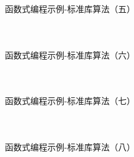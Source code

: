 \documentclass[UTF8,aspectratio=169]{beamer}
\begin{document}
\begin{frame}[fragile]{函数式编程示例-标准库算法（五）}
    \begin{columns}
        \begin{column}{0.48\textwidth}
            \inputminted[firstline=124,lastline=143]{cpp}{code/functional_programming_6.cpp}
        \end{column}
        \begin{column}{0.48\textwidth}
            \inputminted[firstline=145,lastline=159]{cpp}{code/functional_programming_6.cpp}
        \end{column}
    \end{columns}
\end{frame}

\begin{frame}[fragile]{函数式编程示例-标准库算法（六）}
    \begin{columns}
        \begin{column}{0.48\textwidth}
            \inputminted[firstline=161,lastline=174]{cpp}{code/functional_programming_6.cpp}
        \end{column}
        \begin{column}{0.48\textwidth}
            \inputminted[firstline=176,lastline=190]{cpp}{code/functional_programming_6.cpp}
        \end{column}
    \end{columns}
\end{frame}

\begin{frame}[fragile]{函数式编程示例-标准库算法（七）}
    \begin{columns}
        \begin{column}{0.48\textwidth}
            \inputminted[firstline=192,lastline=204]{cpp}{code/functional_programming_6.cpp}
        \end{column}
        \begin{column}{0.48\textwidth}
            \inputminted[firstline=206,lastline=213]{cpp}{code/functional_programming_6.cpp}
        \end{column}
    \end{columns}
\end{frame}

\begin{frame}[fragile]{函数式编程示例-标准库算法（八）}
    \begin{columns}
        \begin{column}{0.48\textwidth}
            \inputminted[firstline=215,lastline=223]{cpp}{code/functional_programming_6.cpp}
        \end{column}
        \begin{column}{0.48\textwidth}
            \inputminted[firstline=225,lastline=233]{cpp}{code/functional_programming_6.cpp}
        \end{column}
    \end{columns}
\end{frame}
\end{document}
